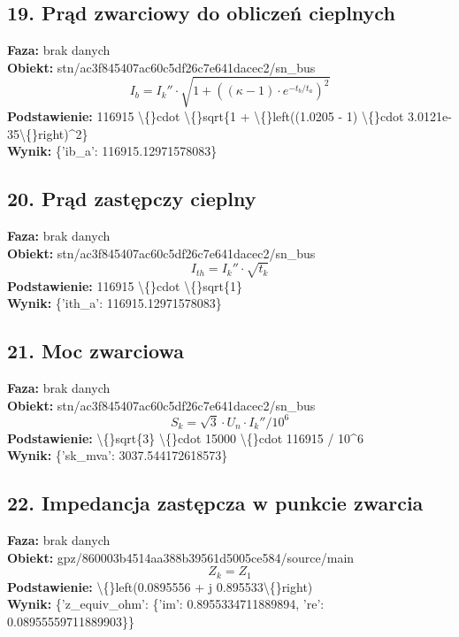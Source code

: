 ﻿\documentclass[11pt]{article}
\begin{document}
\subsection*{19. Prąd zwarciowy do obliczeń cieplnych}
\textbf{Faza:} brak danych\\
\textbf{Obiekt:} stn/ac3f845407ac60c5df26c7e641dacec2/sn\_bus\\
\[
I_b = I_{k}'' \cdot \sqrt{1 + ((\kappa - 1) \cdot e^{-t_b/t_a})^2}
\]
\textbf{Podstawienie:} 116915 \textbackslash\{\}cdot \textbackslash\{\}sqrt\{1 + \textbackslash\{\}left((1.0205 - 1) \textbackslash\{\}cdot 3.0121e-35\textbackslash\{\}right)\textasciicircum{}2\}\\
\textbf{Wynik:} \{'ib\_a': 116915.12971578083\}\\
\subsection*{20. Prąd zastępczy cieplny}
\textbf{Faza:} brak danych\\
\textbf{Obiekt:} stn/ac3f845407ac60c5df26c7e641dacec2/sn\_bus\\
\[
I_{th} = I_{k}'' \cdot \sqrt{t_k}
\]
\textbf{Podstawienie:} 116915 \textbackslash\{\}cdot \textbackslash\{\}sqrt\{1\}\\
\textbf{Wynik:} \{'ith\_a': 116915.12971578083\}\\
\subsection*{21. Moc zwarciowa}
\textbf{Faza:} brak danych\\
\textbf{Obiekt:} stn/ac3f845407ac60c5df26c7e641dacec2/sn\_bus\\
\[
S_k = \sqrt{3} \cdot U_n \cdot I_{k}'' / 10^6
\]
\textbf{Podstawienie:} \textbackslash\{\}sqrt\{3\} \textbackslash\{\}cdot 15000 \textbackslash\{\}cdot 116915 / 10\textasciicircum{}6\\
\textbf{Wynik:} \{'sk\_mva': 3037.544172618573\}\\
\subsection*{22. Impedancja zastępcza w punkcie zwarcia}
\textbf{Faza:} brak danych\\
\textbf{Obiekt:} gpz/860003b4514aa388b39561d5005ce584/source/main\\
\[
Z_k = Z_1
\]
\textbf{Podstawienie:} \textbackslash\{\}left(0.0895556 + j 0.895533\textbackslash\{\}right)\\
\textbf{Wynik:} \{'z\_equiv\_ohm': \{'im': 0.8955334711889894, 're': 0.08955559711889903\}\}\\
\end{document}
